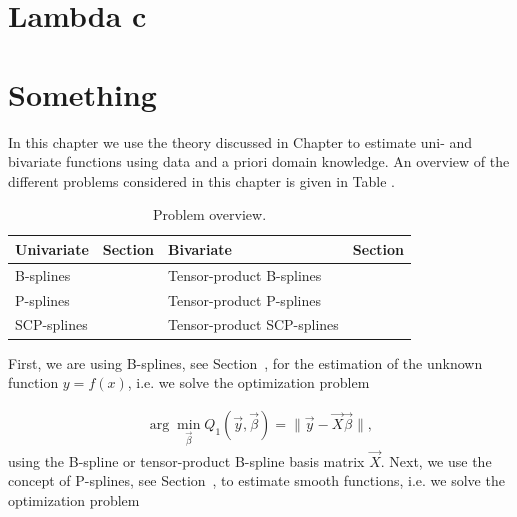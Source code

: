 
\section{Lambda c} \label{sec:lambda_c_sec}


\section{Something}
In this chapter we use the theory discussed in Chapter  to estimate uni- and bivariate  functions using data and a priori domain knowledge. An overview of the different problems considered in this chapter is given in Table . 

\begin{table}[H]
	\centering
	\begin{tabular}{|l|l|l|l|}
		\hline
		\textbf{Univariate}   & \textbf{Section} & \textbf{Bivariate}         & \textbf{Section} \\ \hline \toprule
		B-splines             &                & Tensor-product B-splines   &               \\ \hline
		P-splines             &                & Tensor-product P-splines   &              \\ \hline
		SCP-splines           & 			   & Tensor-product SCP-splines &     \\ \hline \bottomrule
	\end{tabular}
	\caption{Problem overview.}
	\label{tab:problem_overview}
\end{table}
%
First, we are using B-splines, see Section~, for the estimation of the unknown function $y = f(x)$, i.e. we solve the optimization problem

\begin{align} \label{eq:OF-B-splines}
	\arg \min_{\vec{\beta}} Q_1(\vec{y}, \vec{\beta}) = \lVert \vec{y} - \vec{X} \vec{\beta} \rVert,
\end{align}
%
using the B-spline or tensor-product B-spline basis matrix $\vec{X}$. Next, we use the concept of P-splines, see Section~, to estimate smooth functions, i.e. we solve the optimization problem

